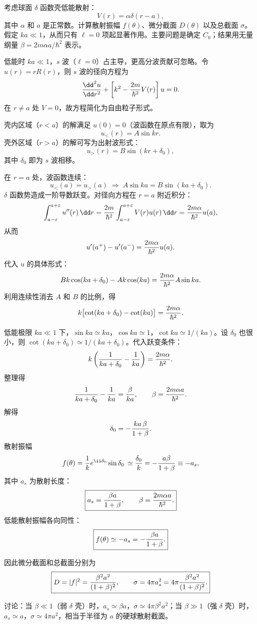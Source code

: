 \begin{question}
考虑球面 $\delta$ 函数壳低能散射：
\[
V(r)=\alpha\delta(r-a),
\]
其中 $\alpha$ 和 $a$ 是正常数。计算散射振幅 $f(\theta)$、微分截面 $D(\theta)$ 以及总截面 $\sigma$。假定 $ka\ll 1$，从而只有 $\ell=0$ 项起显著作用。主要问题是确定 $C_0$；结果用无量纲量 $\beta=2m\alpha a/\hbar^2$ 表示。
\end{question}
\begin{solution}
低能时 $ka\ll1$，$s$ 波（$\ell=0$）占主导，更高分波贡献可忽略。令 $u(r)=rR(r)$，则 $s$ 波的径向方程为
\[
{\dd^2u\over\dd r^2}+\left[k^2-{2m\over\hbar^2}V(r)\right]u=0.
\]
在 $r\neq a$ 处 $V=0$，故方程简化为自由粒子形式。

壳内区域（$r<a$）的解满足 $u(0)=0$（波函数在原点有限），取为
\[
u_{<}(r)=A\sin kr.
\]
壳外区域（$r>a$）的解可写为出射波形式：
\[
u_{>}(r)=B\sin(kr+\delta_0),
\]
其中 $\delta_0$ 即为 $s$ 波相移。

在 $r=a$ 处，波函数连续：
\[
u_{<}(a)=u_{>}(a)\;\Longrightarrow\;A\sin ka=B\sin(ka+\delta_0).
\]
$\delta$ 函数势造成一阶导数跃变。对径向方程在 $r=a$ 附近积分：
\[
\int_{a-\varepsilon}^{a+\varepsilon}u''(r)\,\dd r
={2m\over\hbar^2}\int_{a-\varepsilon}^{a+\varepsilon}V(r)u(r)\,\dd r
={2m\alpha\over\hbar^2}u(a),
\]
从而
\[
u'(a^+)-u'(a^-)={2m\alpha\over\hbar^2}u(a).
\]
代入 $u$ 的具体形式：
\[
Bk\cos(ka+\delta_0)-Ak\cos(ka)={2m\alpha\over\hbar^2}A\sin ka.
\]
利用连续性消去 $A$ 和 $B$ 的比例，得
\[
k\bigl[\cot(ka+\delta_0)-\cot(ka)\bigr]={2m\alpha\over\hbar^2}.
\]

低能极限 $ka\ll1$ 下，$\sin ka\simeq ka$，$\cos ka\simeq1$，$\cot ka\simeq 1/(ka)$。设 $\delta_0$ 也很小，则 $\cot(ka+\delta_0)\simeq 1/(ka+\delta_0)$。代入跃变条件：
\[
k\left({1\over ka+\delta_0}-{1\over ka}\right)={2m\alpha\over\hbar^2}.
\]
整理得
\[
{1\over ka+\delta_0}-{1\over ka}={\beta\over ka},\qquad\beta={2m\alpha a\over\hbar^2}.
\]
解得
\[
\delta_0=-{ka\,\beta\over1+\beta}.
\]
散射振幅
\[
f(\theta)={1\over k}e^{\ii\delta_0}\sin\delta_0\,
\simeq{\delta_0\over k}
=-{a\beta\over1+\beta}\equiv -a_s,
\]
其中 $a_s$ 为散射长度：
\[
\boxed{a_s={\beta a\over1+\beta},\qquad\beta={2m\alpha a\over\hbar^2}.}
\]
低能散射振幅各向同性：
\[
\boxed{f(\theta)\simeq -a_s=-{\beta a\over1+\beta}.}
\]

因此微分截面和总截面分别为
\[
\boxed{D=|f|^2={\beta^2a^2\over(1+\beta)^2},
\qquad
\sigma=4\pi a_s^2=4\pi{\beta^2a^2\over(1+\beta)^2}.}
\]

讨论：当 $\beta\ll1$（弱 $\delta$ 壳）时，$a_s\simeq\beta a$，$\sigma\simeq 4\pi\beta^2a^2$；当 $\beta\gg1$（强 $\delta$ 壳）时，$a_s\simeq a$，$\sigma\simeq 4\pi a^2$，相当于半径为 $a$ 的硬球散射截面。
\end{solution}

